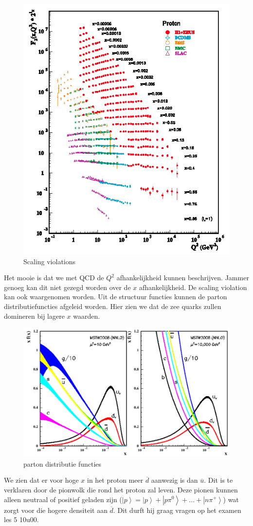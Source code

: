 \documentclass[../main.tex]{subfiles}
\begin{document}
\begin{figure}[h]
    \centering
    \includegraphics[width=0.4\linewidth]{DIS_nucleon_structuur_pdf/scale_viol.png}
    \caption{Scaling violations}%
    \label{fig:scale_viol}
\end{figure}

Het mooie is dat we met QCD de $Q^2$ afhankelijkheid kunnen beschrijven. Jammer genoeg kan dit niet gezegd worden over de $x$ afhankelijkheid. De scaling violation kan ook waargenomen worden. Uit  de structuur functies kunnen de parton distributiefuncties afgeleid worden. Hier zien we dat de zee quarks zullen domineren bij lagere $x$ waarden.

\begin{figure}[h]
    \centering
    \includegraphics[width=0.6\linewidth]{DIS_nucleon_structuur_pdf/part_dist_func.png}
    \caption{parton distributie functies}%
    \label{fig:part_dist_func}
\end{figure}

We zien dat er voor hoge $x$ in het proton meer $\overline d$ aanwezig is dan $\overline u$. Dit is te verklaren door de pionwolk die rond het proton zal leven. Deze pionen kunnen alleen neutraal of positief geladen zijn ($\left|p\right> = \left|p\right> + \left|p\pi^0\right> + ... + \left|n\pi^+\right>$) wat zorgt voor die hogere densiteit aan $\overline d$. {\color{red} Dit durft hij graag vragen op het examen les 5 10u00}.
\end{document}
